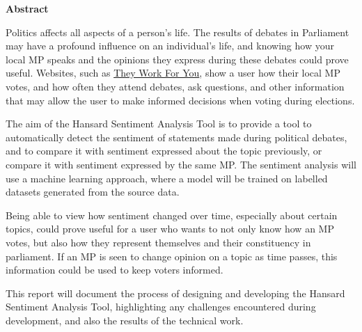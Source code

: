 \thispagestyle{empty}

\begin{center}
    {\LARGE\bf Abstract}
\end{center}

Politics affects all aspects of a person's life. The results of debates in Parliament may have a profound influence on an individual's life, and knowing how your local MP speaks and the opinions they express during these debates could prove useful. Websites, such as \href{https://www.theyworkforyou.com}{They Work For You}, show a user how their local MP votes, and how often they attend debates, ask questions, and other information that may allow the user to make informed decisions when voting during elections.

The aim of the Hansard Sentiment Analysis Tool is to provide a tool to automatically detect the sentiment of statements made during political debates, and to compare it with sentiment expressed about the topic previously, or compare it with sentiment expressed by the same MP. The sentiment analysis will use a machine learning approach, where a model will be trained on labelled datasets generated from the source data.

Being able to view how sentiment changed over time, especially about certain topics, could prove useful for a user who wants to not only know how an MP votes, but also how they represent themselves and their constituency in parliament. If an MP is seen to change opinion on a topic as time passes, this information could be used to keep voters informed.

This report will document the process of designing and developing the Hansard Sentiment Analysis Tool, highlighting any challenges encountered during development, and also the results of the technical work.
